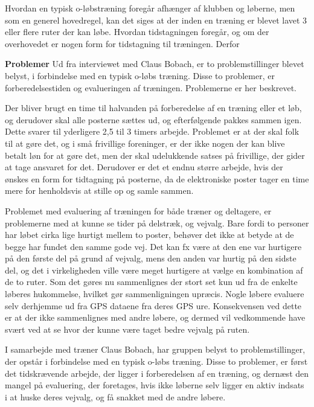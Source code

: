 Hvordan en typisk o-løbstræning foregår afhænger af klubben og løberne, men som en generel hovedregel, kan det siges at der inden en træning er blevet lavet 3 eller flere ruter der kan løbe. Hvordan tidstagningen foregår, og om der overhovedet er nogen form for tidstagning til træningen. Derfor 

\textbf{Problemer}\newline
Ud fra interviewet med Claus Bobach, er to problemstillinger blevet belyst, i forbindelse med en typisk o-løbs træning. Disse to problemer, er forberedelsestiden og evalueringen af træningen. Problemerne er her beskrevet.

Der bliver brugt en time til halvanden på forberedelse af en træning eller et løb, og derudover skal alle posterne sættes ud, og efterfølgende pakkes sammen igen. Dette svarer til yderligere 2,5 til 3 timers arbejde. \newline
Problemet er at der skal folk til at gøre det, og i små frivillige foreninger, er der ikke nogen der kan blive betalt løn for at gøre det, men der skal udelukkende satses på frivillige, der gider at tage ansvaret for det. \newline
Derudover er det et endnu større arbejde, hvis der ønskes en form for tidtagning på posterne, da de elektroniske poster tager en time mere for henholdsvis at stille op og samle sammen. 

Problemet med evaluering af træningen for både træner og deltagere, er problemerne med at kunne se tider på delstræk, og vejvalg. Bare fordi to personer har løbet cirka lige hurtigt mellem to poster, behøver det ikke at betyde at de begge har fundet den samme gode vej. Det kan fx være at den ene var hurtigere på den første del på grund af vejvalg, mens den anden var hurtig på den sidste del, og det i virkeligheden ville være meget hurtigere at vælge en kombination af de to ruter. Som det gøres nu sammenlignes der stort set kun ud fra de enkelte løberes hukommelse, hvilket gør sammenligningen upræcis. Nogle løbere evaluere selv derhjemme ud fra GPS dataene fra deres GPS ure. Konsekvensen ved dette er at der ikke sammenlignes med andre løbere, og dermed vil vedkommende have svært ved at se hvor der kunne være taget bedre vejvalg på ruten.

I samarbejde med træner Claus Bobach, har gruppen belyst to problemstillinger, der opstår i forbindelse med en typisk o-løbs træning. Disse to problemer, er først det tidskrævende arbejde, der ligger i forberedelsen af en træning, og dernæst den mangel på evaluering, der foretages, hvis ikke løberne selv ligger en aktiv indsats i at huske deres vejvalg, og få snakket med de andre løbere. 